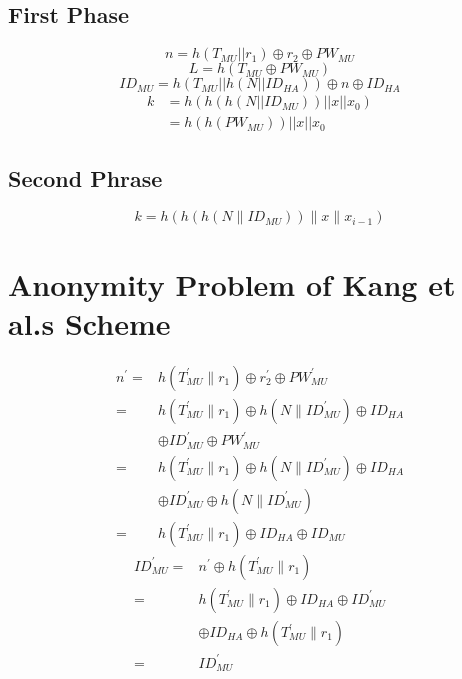 \documentclass{article}
\begin{document}
\subsection{First Phase}
    \begin{equation}
        n = h(T_{MU}||r_{1}) \oplus r_{2} \oplus PW_{MU}
    \end{equation}
    \begin{equation}
        L = h(T_{MU} \oplus PW_{MU})
    \end{equation}
    \begin{equation}
        ID_{MU} = h(T_{MU}||h(N|| ID_{HA}))\oplus n \oplus ID_{HA}
    \end{equation}    
   \begin{equation}
    \begin{aligned}
        k & = h(h(h(N||ID_{MU}))||x||x_{0}) \\
          & = h(h(PW_{MU}))||x||x_{0}
    \end{aligned}         
    \end{equation}
\subsection{Second Phrase}
\begin{equation}
    k=h\left(h\left(h\left(N \| I D_{M U}\right)\right)\|x\| x_{i-1}\right)
\end{equation}
\section {Anonymity Problem of Kang et al.s Scheme}
\begin{equation}
    \begin{aligned}
        n^{\prime}=& h\left(T_{M U}^{\prime} \| r_{1}\right) \oplus r_{2}^{\prime} \oplus P W_{M U}^{\prime} \\
        =& h\left(T_{M U}^{\prime} \| r_{1}\right) \oplus h\left(N \| I D_{M U}^{\prime}\right) \oplus I D_{H A} \\
        & \oplus I D_{M U}^{\prime} \oplus P W_{M U}^{\prime} \\
        =& h\left(T_{M U}^{\prime} \| r_{1}\right) \oplus h\left(N \| I D_{M U}^{\prime}\right) \oplus I D_{H A} \\
        & \oplus I D_{M U}^{\prime} \oplus h\left(N \| I D_{M U}^{\prime}\right) \\
        =& h\left(T_{M U}^{\prime} \| r_{1}\right) \oplus I D_{H A} \oplus I D_{M U}
        \end{aligned}
\end{equation}
\begin{equation}
    \begin{aligned}
        I D_{M U}^{\prime}=& n^{\prime} \oplus h\left(T_{M U}^{\prime} \| r_{1}\right) \\
        =& h\left(T_{M U}^{\prime} \| r_{1}\right) \oplus I D_{H A} \oplus I D_{M U}^{\prime} \\
        & \oplus I D_{H A} \oplus h\left(T_{M U}^{\prime} \| r_{1}\right) \\
        =& I D_{M U}^{\prime}
        \end{aligned}
\end{equation}
\end{document}
